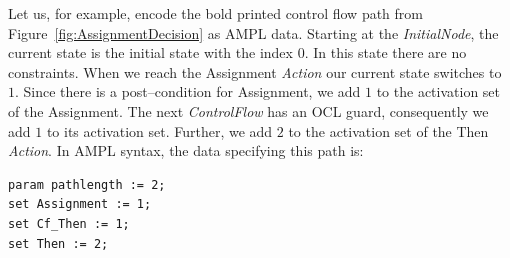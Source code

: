 \documentclass[runningheads,a4paper]{llncs}%
\newcommand{\UMLType}[1]{\textsf{\textit{#1}}} %
\begin{document}
Let us, for example, encode the bold printed control flow path from
Figure~\ref{fig:AssignmentDecision} as AMPL data. Starting at the
\UMLType{InitialNode}, the current state is the initial state with the index
$0$. In this state there are no constraints. When we reach the Assignment
\UMLType{Action} our current state switches to $1$. Since there is a
post--condition for Assignment, we add $1$ to the activation set of the
Assignment. The next \UMLType{ControlFlow} has an OCL guard, consequently we add
$1$ to its activation set. Further, we add $2$ to the activation set of the Then
\UMLType{Action}. In AMPL syntax, the data specifying this path is:%
\begin{lstlisting}[basicstyle=\ttfamily,language=ampl]
param pathlength := 2;
set Assignment := 1;
set Cf_Then := 1;
set Then := 2;
\end{lstlisting}%
%
\end{document}
